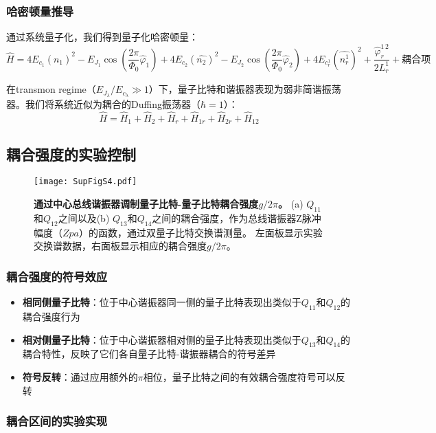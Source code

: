 \documentclass[11pt,a4paper]{article}
\begin{document}
\subsubsection{哈密顿量推导}

通过系统量子化，我们得到量子化哈密顿量：
\[
\hat{H} = 4E_{c_1}(\hat{n_1})^2 - E_{J_1}\cos\left(\frac{2\pi}{\Phi_0}\hat{\varphi}_1\right) + 4E_{c_2}(\hat{n_2})^2 - E_{J_2}\cos\left(\frac{2\pi}{\Phi_0}\hat{\varphi}_2\right) + 4E_{c^1_r}(\hat{n^1_r})^2 + \frac{\hat{\varphi}^{1\,2}_r}{2L^1_r} + \text{耦合项}
\]

在transmon regime（$E_{J_\lambda}/E_{c_\lambda} \gg 1$）下，量子比特和谐振器表现为弱非简谐振荡器。我们将系统近似为耦合的Duffing振荡器（$\hbar=1$）：
\[
\hat{H} = \hat{H}_1 + \hat{H}_2 + \hat{H}_r + \hat{H}_{1r} + \hat{H}_{2r} + \hat{H}_{12}
\]

\subsection{耦合强度的实验控制}

\begin{figure}[H]
    \centering
    \texttt{[image: SupFigS4.pdf]}
    \caption{
        \textbf{通过中心总线谐振器调制量子比特-量子比特耦合强度$g/2\pi$。}
        (a) $Q_{11}$和$Q_{12}$之间以及(b) $Q_{13}$和$Q_{14}$之间的耦合强度，作为总线谐振器Z脉冲幅度（$Zpa$）的函数，通过双量子比特交换谱测量。
        左面板显示实验交换谱数据，右面板显示相应的耦合强度$g/2\pi$。
    }
    \label{fig:coupling_modulation}
\end{figure}

\subsubsection{耦合强度的符号效应}

\begin{itemize}
    \item \textbf{相同侧量子比特}：位于中心谐振器同一侧的量子比特表现出类似于$Q_{11}$和$Q_{12}$的耦合强度行为
    \item \textbf{相对侧量子比特}：位于中心谐振器相对侧的量子比特表现出类似于$Q_{13}$和$Q_{14}$的耦合特性，反映了它们各自量子比特-谐振器耦合的符号差异
    \item \textbf{符号反转}：通过应用额外的$\pi$相位，量子比特之间的有效耦合强度符号可以反转
\end{itemize}

\subsubsection{耦合区间的实验实现}
\end{document}

